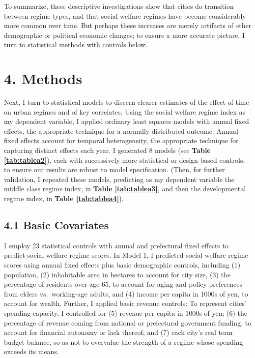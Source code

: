 \documentclass[preprint, 3p,
authoryear]{elsarticle} %
\begin{document}
To summarize, these descriptive investigations show that cities do
transition between regime types, and that social welfare regimes have
become considerably more common over time. But perhaps these increases
are merely artifacts of other demographic or political economic changes;
to ensure a more accurate picture, I turn to statistical methods with
controls below.

\hypertarget{methods}{%
\section{4. Methods}\label{methods}}

Next, I turn to statistical models to discern clearer estimates of the
effect of time on urban regimes and of key correlates. Using the social
welfare regime index as my dependent variable, I applied ordinary least
squares models with annual fixed effects, the appropriate technique for
a normally distributed outcome. Annual fixed effects account for
temporal heterogeneity, the appropriate technique for capturing distinct
effects each year. I generated 8 models (see
\textbf{Table \ref{tab:tablea2}}), each with successively more
statistical or design-based controls, to ensure our results are robust
to model specification. (Then, for further validation, I repeated these
models, predicting as my dependent variable the middle class regime
index, in \textbf{Table \ref{tab:tablea3}}, and then the developmental
regime index, in \textbf{Table \ref{tab:tablea4}}).

\hypertarget{basic-covariates}{%
\subsection{4.1 Basic Covariates}\label{basic-covariates}}

I employ 23 statistical controls with annual and prefectural fixed
effects to predict social welfare regime scores. In Model 1, I predicted
social welfare regime scores using annual fixed effects plus basic
demographic controls, including (1) population, (2) inhabitable area in
hectares to account for city size, (3) the percentage of residents over
age 65, to account for aging and policy preferences from elders
vs.~working-age adults, and (4) income per capita in 1000s of yen, to
account for wealth. Further, I applied basic revenue controls: To
represent cities' spending capacity, I controlled for (5) revenue per
capita in 1000s of yen; (6) the percentage of revenue coming from
national or prefectural government funding, to account for financial
autonomy or lack thereof; and (7) each city's real term budget balance,
so as not to overvalue the strength of a regime whose spending exceeds
its means.
\end{document}
